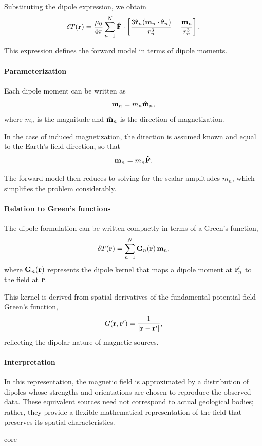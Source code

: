 {Substituting the dipole expression, we obtain
\begin{equation}
    \delta T(\vb{r}) = \frac{\mu_0}{4\pi} \sum_{n=1}^{N} \vu{F} \cdot
    \left[
    \frac{3\vu{r}_n (\vb{m}_n \cdot \vu{r}_n)}{r_n^3} - \frac{\vb{m}_n}{r_n^3}
    \right].
\end{equation}

This expression defines the forward model in terms of dipole moments.

\paragraph{Parameterization}

Each dipole moment can be written as
\begin{equation}
    \vb{m}_n = m_n \vu{m}_n,
\end{equation}
where $m_n$ is the magnitude and $\vu{m}_n$ is the direction of magnetization.

In the case of induced magnetization, the direction is assumed known and equal to the Earth's field direction, so that
\begin{equation}
    \vb{m}_n = m_n \vu{F}.
\end{equation}

The forward model then reduces to solving for the scalar amplitudes $m_n$, which simplifies the problem considerably.

\paragraph{Relation to Green's functions}

The dipole formulation can be written compactly in terms of a Green's function,
\begin{equation}
    \delta T(\vb{r}) = \sum_{n=1}^{N} \mathbf{G}_n(\vb{r}) \, \vb{m}_n,
\end{equation}
where $\mathbf{G}_n(\vb{r})$ represents the dipole kernel that maps a dipole moment at $\vb{r}_n'$ to the field at $\vb{r}$.

This kernel is derived from spatial derivatives of the fundamental potential-field Green's function,
\begin{equation}
    G(\vb{r}, \vb{r}') = \frac{1}{|\vb{r} - \vb{r}'|},
\end{equation}
reflecting the dipolar nature of magnetic sources.

\paragraph{Interpretation}

In this representation, the magnetic field is approximated by a distribution of dipoles whose strengths and orientations are chosen to reproduce the observed data. These equivalent sources need not correspond to actual geological bodies; rather, they provide a flexible mathematical representation of the field that preserves its spatial characteristics.
}{core}\label{box:aside}

